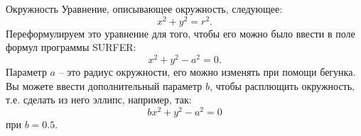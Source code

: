 \begin{surferPage}{Окружность}
Уравнение, описывающее окружность, следующее:
\[x^2+y^2=r^2.\]
Переформулируем это уравнение для того, чтобы его можно было ввести в поле формул программы SURFER:
\[x^2+y^2-a^2=0.\]
Параметр $a$ – это радиус окружности, его можно изменять при помощи бегунка. Вы можете ввести дополнительный параметр $b$, чтобы расплющить окружность, т.е. сделать из него эллипс, например, так:
\[bx^2+y^2-a^2=0\] при $b=0.5$.
\end{surferPage}
